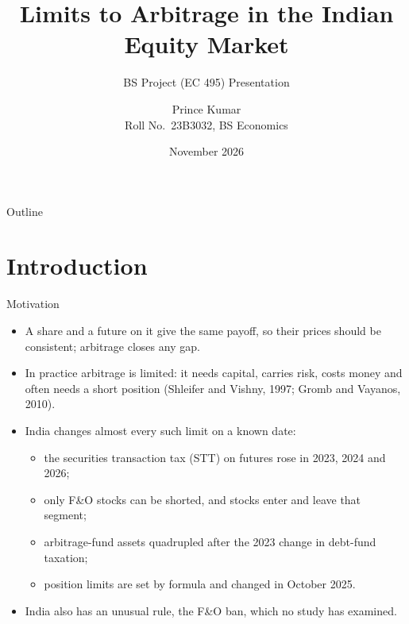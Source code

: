 \documentclass[11pt]{beamer}
\title[Limits to Arbitrage in Indian Equities]{Limits to Arbitrage in the Indian Equity Market}
\subtitle{BS Project (EC 495) Presentation}
\author[Prince Kumar]{{\small Prince Kumar}\\{\scriptsize Roll No.\ 23B3032, BS Economics}}
\institute[IIT Bombay]{{\scriptsize\textit{Supervisor:} Prof.\ Aditi Chaubal}\\[4pt]
  {\scriptsize Department of Economics\\Indian Institute of Technology Bombay}}
\date[November 2026]{November 2026}
\begin{document}
\begin{frame}
  \titlepage
\end{frame}

\begin{frame}{Outline}
  \tableofcontents
\end{frame}

\section{Introduction}

\begin{frame}{Motivation}
  \begin{itemize}
    \item A share and a future on it give the same payoff, so their prices should be consistent; arbitrage closes
    any gap.
    \item In practice arbitrage is limited: it needs capital, carries risk, costs money and often needs a short
    position (Shleifer and Vishny, 1997; Gromb and Vayanos, 2010).
    \item India changes almost every such limit on a known date:
    \begin{itemize}
      \item the securities transaction tax (STT) on futures rose in 2023, 2024 and 2026;
      \item only F\&O stocks can be shorted, and stocks enter and leave that segment;
      \item arbitrage-fund assets quadrupled after the 2023 change in debt-fund taxation;
      \item position limits are set by formula and changed in October 2025.
    \end{itemize}
    \item India also has an unusual rule, the \alert{F\&O ban}, which no study has examined.
  \end{itemize}
\end{frame}
\end{document}
